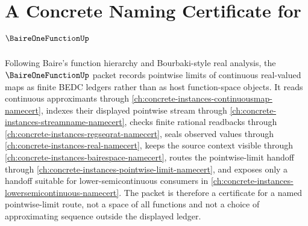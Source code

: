 \chapter{A Concrete Naming Certificate for $\BaireOneFunctionUp$}
\label{ch:concrete-instances-baireonefunction-namecert}

Following Baire's function hierarchy and Bourbaki-style real analysis, the $\BaireOneFunctionUp$ packet records pointwise limits of continuous real-valued maps as finite BEDC ledgers rather than as host function-space objects. It reads continuous approximants through \autoref{ch:concrete-instances-continuousmap-namecert}, indexes their displayed pointwise stream through \autoref{ch:concrete-instances-streamname-namecert}, checks finite rational readbacks through \autoref{ch:concrete-instances-regseqrat-namecert}, seals observed values through \autoref{ch:concrete-instances-real-namecert}, keeps the source context visible through \autoref{ch:concrete-instances-bairespace-namecert}, routes the pointwise-limit handoff through \autoref{ch:concrete-instances-pointwise-limit-namecert}, and exposes only a handoff suitable for lower-semicontinuous consumers in \autoref{ch:concrete-instances-lowersemicontinuous-namecert}. The packet is therefore a certificate for a named pointwise-limit route, not a space of all functions and not a choice of approximating sequence outside the displayed ledger.

